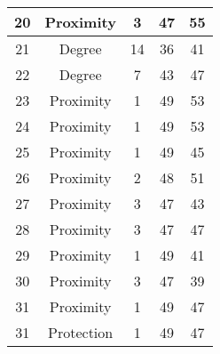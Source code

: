 \documentclass[results.tex]{subfiles}
\begin{document}
\begin{center}
\begin{tabular}{| c || c | c | c | c |}
            \hline
            20                      & Proximity                    & 3                      & 47                      & 55                   \\
            \hline
            21                      & Degree                       & 14                     & 36                      & 41                   \\
            \hline
            22                      & Degree                       & 7                      & 43                      & 47                   \\
            \hline
            23                      & Proximity                    & 1                      & 49                      & 53                   \\
            \hline
            24                      & Proximity                    & 1                      & 49                      & 53                   \\
            \hline
            25                      & Proximity                    & 1                      & 49                      & 45                   \\
            \hline
            26                      & Proximity                    & 2                      & 48                      & 51                   \\
            \hline
            27                      & Proximity                    & 3                      & 47                      & 43                   \\
            \hline
            28                      & Proximity                    & 3                      & 47                      & 47                   \\
            \hline
            29                      & Proximity                    & 1                      & 49                      & 41                   \\
            \hline
            30                      & Proximity                    & 3                      & 47                      & 39                   \\
            \hline
            31                      & Proximity                    & 1                      & 49                      & 47                   \\
            \hline
            31                      & Protection                   & 1                      & 49                      & 47                   \\

\end{tabular}
\end{center}
\end{document}
